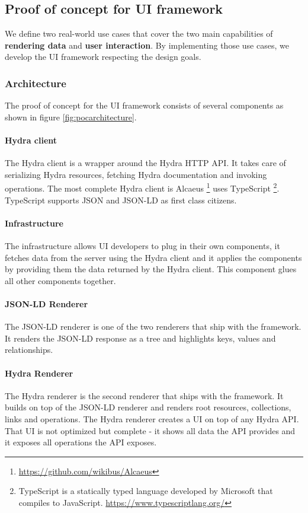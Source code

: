 \subsection{Proof of concept for UI framework}\label{proofofconcept}
We define two real-world use cases that cover the two main capabilities of \textbf{rendering data} and \textbf{user interaction}. By implementing those use cases, we develop the UI framework respecting the design goals.

\subsubsection{Architecture}
The proof of concept for the UI framework consists of several components as shown in figure \ref{fig:pocarchitecture}.

\paragraph{Hydra client}
The Hydra client is a wrapper around the Hydra HTTP API. It takes care of serializing Hydra resources, fetching Hydra documentation and invoking operations. The most complete Hydra client is Alcaeus \footnote{\url{https://github.com/wikibus/Alcaeus}} uses TypeScript \footnote{TypeScript is a statically typed language developed by Microsoft that compiles to JavaScript. \url{https://www.typescriptlang.org/}}. TypeScript supports JSON and JSON-LD as first class citizens.

\paragraph{Infrastructure}
The infrastructure allows UI developers to plug in their own components, it fetches data from the server using the Hydra client and it applies the components by providing them the data returned by the Hydra client. This component glues all other components together.

\paragraph{JSON-LD Renderer}
The JSON-LD renderer is one of the two renderers that ship with the framework. It renders the JSON-LD response as a tree and highlights keys, values and relationships.

\paragraph{Hydra Renderer}
The Hydra renderer is the second renderer that ships with the framework. It builds on top of the JSON-LD renderer and renders root resources, collections, links and operations. The Hydra renderer creates a UI on top of any Hydra API. That UI is not optimized but complete - it shows all data the API provides and it exposes all operations the API exposes.

